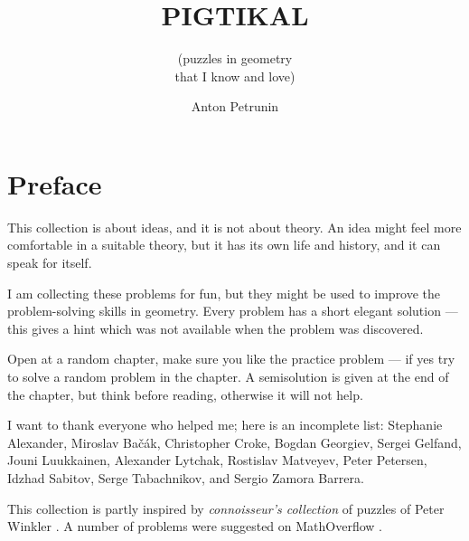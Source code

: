\documentclass[twoside]{book}
\begin{document}

\title{PIGTIKAL}
\subtitle{(puzzles in geometry\\
that I know and love)}
\author{Anton Petrunin}
\date{}
\maketitle



\thispagestyle{empty}
\tableofcontents
\thispagestyle{empty}

\newpage
\thispagestyle{empty}
\section*{Preface}

This collection is about ideas, and it is not about theory.
An idea might feel more comfortable in a suitable theory,
but it has its own life and history, and it can speak for itself.

I am collecting these problems for fun, 
but they might be used to improve 
the problem-solving skills in geometry.
Every problem has a short elegant solution ---
this gives a hint which was not available
when the problem was discovered.


Open at a random chapter, make sure you like the practice problem --- if yes try to solve a random problem in the chapter.
A semisolution is given at the end of the chapter,
but think before reading,
otherwise it will not help. 

I want to thank everyone who helped me;
here is an incomplete list:
Stephanie Alexander,
Miroslav Ba\v{c}\'{a}k, 
Christopher Croke,
Bogdan Georgiev,
Sergei Gelfand,
Jouni Luukkainen,
Alexander Lytchak,
Rostislav Matveyev, 
Peter Petersen, 
Idzhad Sabitov,
Serge Tabachnikov, and
Sergio Zamora Barrera.

This collection is partly inspired by \emph{connoisseur's collection} of puzzles of Peter Winkler \cite[][]{winkler}.
A number of problems were suggested on MathOverflow \cite[][]{One-step}.
\end{document}
